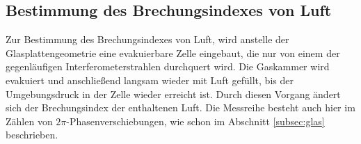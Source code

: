 \subsection{Bestimmung des Brechungsindexes von Luft}
Zur Bestimmung des Brechungsindexes von Luft, wird anstelle der Glasplattengeometrie eine evakuierbare Zelle eingebaut, die nur von einem der gegenläufigen Interferometerstrahlen durchquert wird. Die Gaskammer wird evakuiert und anschließend langsam wieder mit Luft gefüllt, bis der Umgebungsdruck in der Zelle wieder erreicht ist. Durch diesen Vorgang ändert sich der Brechungsindex der enthaltenen Luft. Die Messreihe besteht auch hier im Zählen von $2\pi$-Phasenverschiebungen, wie schon im Abschnitt \ref{subsec:glas} beschrieben.
